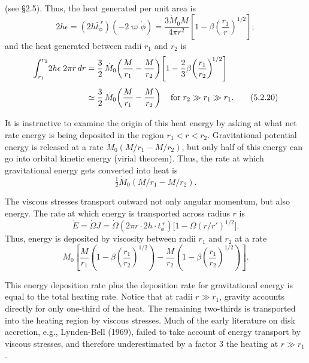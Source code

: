 

(see \S2.5). Thus, the heat generated per unit area is
\begin{equation}
2h\epsilon = (2h\bar{t}_\phi^{\;r})(-2\varpi\dot{\phi})
= \frac{3\dot{M}_0 M}{4\pi r^2}\left[1-\beta\!\left(\frac{r_1}{r}\right)^{\!1/2}\right];
\tag{5.2.19}
\end{equation}
and the heat generated between radii $r_1$ and $r_2$ is
\begin{align}
\int_{r_1}^{r_2}\! 2h\epsilon\;2\pi r\,dr
&= \frac{3}{2}\,\dot{M}_0\!\left(\frac{M}{r_1}-\frac{M}{r_2}\right)
   \!\left[1-\frac{2}{3}\beta\!\left(\frac{r_1}{r_2}\right)^{\!1/2}\right] \notag\\[4pt]
&\simeq \frac{3}{2}\,\dot{M}_0\!\left(\frac{M}{r_1}-\frac{M}{r_2}\right)
   \quad\text{for}\;r_2 \gg r_1 \gg r_1.
\tag{5.2.20}
\end{align}

It is instructive to examine the origin of this heat energy by asking at what
net rate energy is being deposited in the region $r_1 < r < r_2$. Gravitational
potential energy is released at a rate $\dot{M}_0(M/r_1 - M/r_2)$, but only half of this
energy can go into orbital kinetic energy
(virial theorem). Thus, the rate at which gravitational energy gets converted
into heat is
\[
\tfrac{1}{2}\dot{M}_0(M/r_1 - M/r_2).
\]

The viscous stresses transport outward not only angular momentum, but also
energy. The rate at which energy is transported across radius $r$ is
\[
\dot{E} = \dot{\varOmega}J
= \dot{\varOmega}(2\pi r\cdot 2h\cdot t_\phi^{\;r})\bigl[1-\Omega(r/r')^{1/2}\bigr].
\]
Thus, energy is deposited by viscosity between radii $r_1$ and $r_2$ at a rate
\[
\dot{M}_0\!\left[\frac{M}{r_1}\left(1-\beta\!\left(\frac{r_1}{r_2}\right)^{\!1/2}\right)
-\frac{M}{r_2}\left(1-\beta\!\left(\frac{r_1}{r_2}\right)^{\!1/2}\right)\right].
\]

This energy deposition rate plus the deposition rate for gravitational energy is
equal to the total heating rate. Notice that at radii $r \gg r_1$, gravity accounts
directly for only one-third of the heat. The remaining two-thirds is transported
into the heating region by viscous stresses. Much of the early literature on disk
accretion, e.g., Lynden-Bell (1969)\cite{LyndenBell1969}, failed to take account of energy transport
by viscous stresses, and therefore underestimated by a factor 3 the heating at
$r \gg r_1$.

